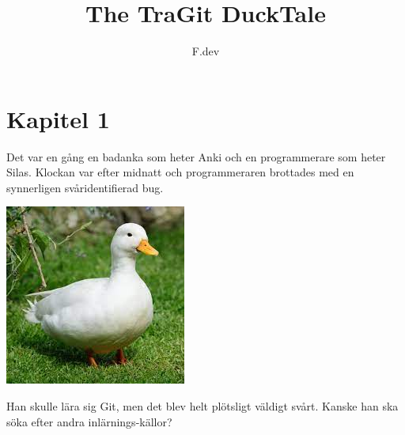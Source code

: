 \documentclass[a4paper]{article}
\begin{document}
\title{The TraGit DuckTale}
\author{F.dev}
\maketitle

\section*{Kapitel 1}
Det var en gång en badanka som heter Anki och en programmerare som heter Silas.
Klockan var efter midnatt och programmeraren brottades med en synnerligen svåridentifierad bug.

\begin{center}
	\includegraphics[scale=0.3]{duck.jpeg}
\end{center}

Han skulle lära sig Git, men det blev helt plötsligt väldigt svårt. Kanske han ska söka efter andra inlärnings-källor?

\end{document}
